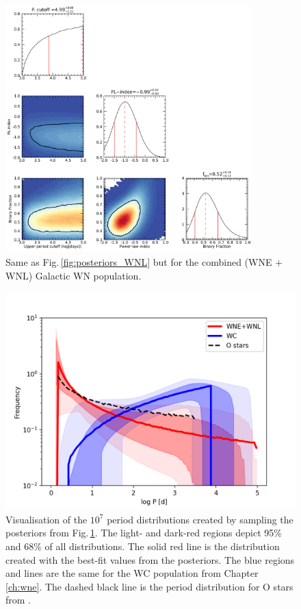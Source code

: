 \begin{figure}[ht]
    \centering
    \includegraphics[width=0.85\textwidth]{chapters/WNL/image/WNall_May18_4RVbins_stat9.png}
    \caption{Same as Fig.\,\ref{fig:posteriors_WNL} but for the combined (WNE + WNL) Galactic WN population.}
    \label{fig:posteriors_WN}
\end{figure}

\begin{figure}
    \centering
    \includegraphics[width=\hsize]{chapters/WNL/image/WNall_sampled_periods_log.png}
    \caption{Visualisation of the $10^7$ period distributions created by sampling the posteriors from Fig.\,\ref{fig:posteriors_WN}. The light- and dark-red regions depict 95\% and 68\% of all distributions. The solid red line is the distribution created with the best-fit values from the posteriors. The blue regions and lines are the same for the WC population from Chapter \ref{ch:wne}. The dashed black line is the period distribution for O stars from \citet{sana_binary_2012}.}
    \label{fig:pdist_WN_WC}
\end{figure}

